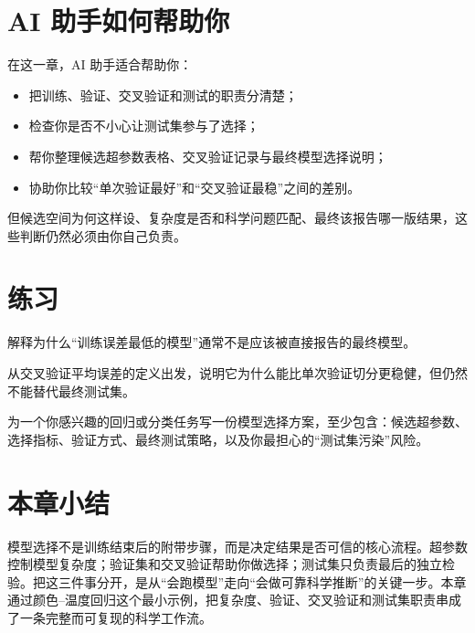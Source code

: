 \section{AI 助手如何帮助你}

在这一章，AI 助手适合帮助你：

\begin{itemize}
    \item 把训练、验证、交叉验证和测试的职责分清楚；
    \item 检查你是否不小心让测试集参与了选择；
    \item 帮你整理候选超参数表格、交叉验证记录与最终模型选择说明；
    \item 协助你比较“单次验证最好”和“交叉验证最稳”之间的差别。
\end{itemize}

但候选空间为何这样设、复杂度是否和科学问题匹配、最终该报告哪一版结果，这些判断仍然必须由你自己负责。

\section{练习}

\begin{exercisebox}[基础练习]
解释为什么“训练误差最低的模型”通常不是应该被直接报告的最终模型。
\end{exercisebox}

\begin{exercisebox}[进阶练习]
从交叉验证平均误差的定义出发，说明它为什么能比单次验证切分更稳健，但仍然不能替代最终测试集。
\end{exercisebox}

\begin{exercisebox}[开放练习]
为一个你感兴趣的回归或分类任务写一份模型选择方案，至少包含：候选超参数、选择指标、验证方式、最终测试策略，以及你最担心的“测试集污染”风险。
\end{exercisebox}

\section{本章小结}

模型选择不是训练结束后的附带步骤，而是决定结果是否可信的核心流程。超参数控制模型复杂度；验证集和交叉验证帮助你做选择；测试集只负责最后的独立检验。把这三件事分开，是从“会跑模型”走向“会做可靠科学推断”的关键一步。本章通过颜色--温度回归这个最小示例，把复杂度、验证、交叉验证和测试集职责串成了一条完整而可复现的科学工作流。
